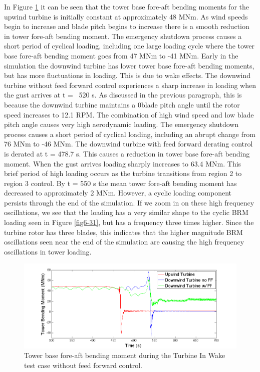 In Figure \ref{fig6-32} it can be seen that the tower base fore-aft bending moments for the upwind turbine is initially constant at approximately 48 MNm. As wind speeds begin to increase and blade pitch begins to increase there is a smooth reduction in tower fore-aft bending moment. The emergency shutdown process causes a short period of cyclical loading, including one large loading cycle where the tower base fore-aft bending moment goes from 47 MNm to -41 MNm. Early in the simulation the downwind turbine has lower tower base fore-aft bending moments, but has more fluctuations in loading. This is due to wake effects. The downwind turbine without feed forward control experiences a sharp increase in loading when the gust arrives at t = ~520 s. As discussed in the previous paragraph, this is because the downwind turbine maintains a 0\degree blade pitch angle until the rotor speed increases to 12.1 RPM. The combination of high wind speed and low blade pitch angle causes very high aerodynamic loading. The emergency shutdown process causes a short period of cyclical loading, including an abrupt change from 76 MNm to -46 MNm. The downwind turbine with feed forward derating control is derated at t = 478.7 s. This causes a reduction in tower base fore-aft bending moment. When the gust arrives loading sharply increases to 63.4 MNm. This brief period of high loading occurs as the turbine transitions from region 2 to region 3 control. By t = 550 s the mean tower fore-aft bending moment has decreased to approximately 2 MNm. However, a cyclic loading component persists through the end of the simulation. If we zoom in on these high frequency oscillations, we see that the loading has a very similar shape to the cyclic BRM loading seen in Figure \ref{fig6-31}, but has a frequency three times higher. Since the turbine rotor has three blades, this indicates that the higher magnitude BRM oscillations seen near the end of the simulation are causing the high frequency oscillations in tower loading. 


\begin{figure}[ht] 
	\centering
		\includegraphics[width = \linewidth]{Figures/ch6Figures/fig6-32.png}

	\caption{Tower base fore-aft bending moment during the Turbine In Wake test case without feed forward control.}
	\label{fig6-32}
\end{figure}


